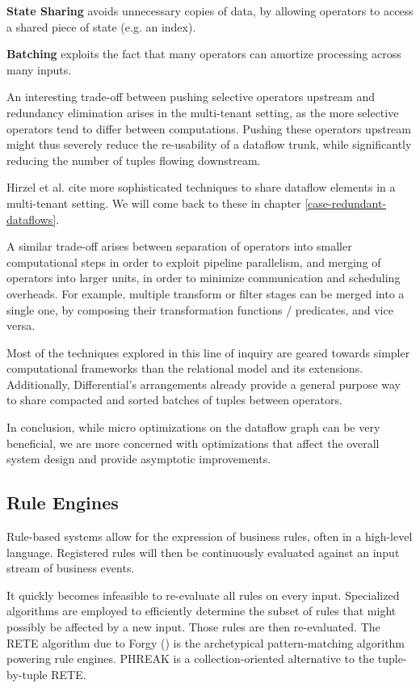 \documentclass[../index.tex]{subfiles}
\begin{document}
\textbf{State Sharing} avoids unnecessary copies of data, by allowing
operators to access a shared piece of state (e.g. an index).

\textbf{Batching} exploits the fact that many operators can amortize
processing across many inputs.

An interesting trade-off between pushing selective operators upstream
and redundancy elimination arises in the multi-tenant setting, as the
more selective operators tend to differ between computations. Pushing
these operators upstream might thus severely reduce the re-usability
of a dataflow trunk, while significantly reducing the number of tuples
flowing downstream. 

Hirzel et al. cite more sophisticated techniques to share dataflow
elements in a multi-tenant setting. We will come back to these in
chapter \ref{case-redundant-dataflows}.

A similar trade-off arises between separation of operators into
smaller computational steps in order to exploit pipeline parallelism,
and merging of operators into larger units, in order to minimize
communication and scheduling overheads. For example, multiple
transform or filter stages can be merged into a single one, by
composing their transformation functions / predicates, and vice versa.

Most of the techniques explored in this line of inquiry are geared
towards simpler computational frameworks than the relational model and
its extensions. Additionally, Differential's arrangements already
provide a general purpose way to share compacted and sorted batches of
tuples between operators.

In conclusion, while micro optimizations on the dataflow graph can be
very beneficial, we are more concerned with optimizations that affect
the overall system design and provide asymptotic improvements.

\subsection{Rule Engines}

Rule-based systems allow for the expression of business rules, often
in a high-level language. Registered rules will then be continuously
evaluated against an input stream of business events.

It quickly becomes infeasible to re-evaluate all rules on every
input. Specialized algorithms are employed to efficiently determine
the subset of rules that might possibly be affected by a new
input. Those rules are then re-evaluated. The RETE algorithm due to
Forgy (\cite{forgy1989rete}) is the archetypical pattern-matching
algorithm powering rule engines. PHREAK \cite{drools} is a
collection-oriented alternative to the tuple-by-tuple RETE.
\end{document}
